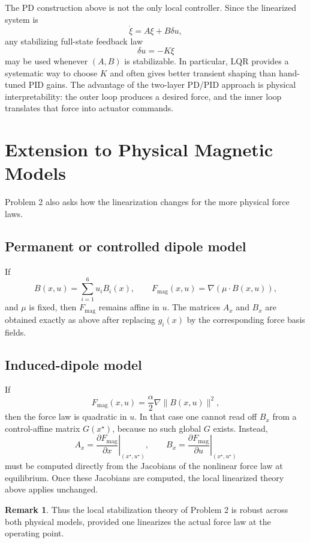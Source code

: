 \documentclass[11pt]{article}
\theoremstyle{definition}
\newtheorem{remark}{Remark}
\begin{document}
The PD construction above is not the only local controller. Since the linearized system is
\[
\dot\xi=A\xi+B\delta u,
\]
any stabilizing full-state feedback law
\[
\delta u = -K\xi
\]
may be used whenever $(A,B)$ is stabilizable. In particular, LQR provides a systematic way to choose $K$ and often gives better transient shaping than hand-tuned PID gains. The advantage of the two-layer PD/PID approach is physical interpretability: the outer loop produces a desired force, and the inner loop translates that force into actuator commands.

\section{Extension to Physical Magnetic Models}

Problem 2 also asks how the linearization changes for the more physical force laws.

\subsection*{Permanent or controlled dipole model}
If
\[
B(x,u)=\sum_{i=1}^6 u_i B_i(x),
\qquad
F_{\mathrm{mag}}(x,u)=\nabla(\mu\cdot B(x,u)),
\]
and $\mu$ is fixed, then $F_{\mathrm{mag}}$ remains affine in $u$. The matrices $A_x$ and $B_x$ are obtained exactly as above after replacing $g_i(x)$ by the corresponding force basis fields.

\subsection*{Induced-dipole model}
If
\[
F_{\mathrm{mag}}(x,u)=\frac{\alpha}{2}\nabla\|B(x,u)\|^2,
\]
then the force law is quadratic in $u$. In that case one cannot read off $B_x$ from a control-affine matrix $G(x^\star)$, because no such global $G$ exists. Instead,
\[
A_x = \left.\frac{\partial F_{\mathrm{mag}}}{\partial x}\right|_{(x^\star,u^\star)},
\qquad
B_x = \left.\frac{\partial F_{\mathrm{mag}}}{\partial u}\right|_{(x^\star,u^\star)}
\]
must be computed directly from the Jacobians of the nonlinear force law at equilibrium. Once these Jacobians are computed, the local linearized theory above applies unchanged.

\begin{remark}
Thus the local stabilization theory of Problem 2 is robust across both physical models, provided one linearizes the actual force law at the operating point.
\end{remark}
\end{document}
